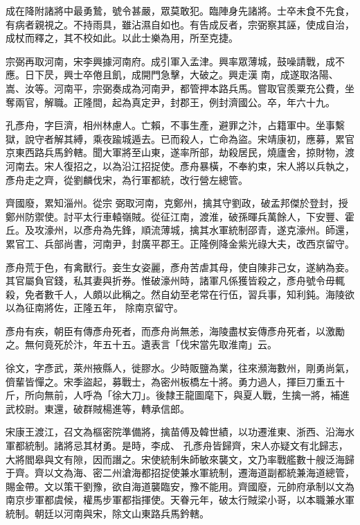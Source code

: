 \begin{pinyinscope}
 成在降附諸將中最勇鷙，號令甚嚴，眾莫敢犯。臨陣身先諸將。士卒未食不先食，有病者親視之。不持雨具，雖沾濕自如也。有告成反者，宗弼察其誣，使成自治，成杖而釋之，其不校如此。以此士樂為用，所至克捷。



 宗弼再取河南，宋李興據河南府。成引軍入孟津。興率眾薄城，鼓噪請戰，成不應。日下昃，興士卒倦且飢，成開門急擊，大破之。興走漢
 南，成遂取洛陽、嵩、汝等。河南平，宗弼奏成為河南尹，都管押本路兵馬。嘗取官羨粟充公費，坐奪兩官，解職。正隆間，起為真定尹，封郡王，例封濟國公。卒，年六十九。



 孔彥舟，字巨濟，相州林慮人。亡賴，不事生產，避罪之汴，占籍軍中。坐事繫獄，說守者解其縛，乘夜踰城遁去。已而殺人，亡命為盜。宋靖康初，應募，累官京東西路兵馬鈐轄。聞大軍將至山東，遂率所部，劫殺居民，燒廬舍，掠財物，渡河南去。宋人復招之，以為沿江招捉使。彥舟暴橫，不奉約束，宋人將以兵執之，彥舟走之齊，從劉麟伐宋，為行軍都統，改行營左總管。



 齊國廢，累知淄州。從宗
 弼取河南，克鄭州，擒其守劉政，破孟邦傑於登封，授鄭州防禦使。討平太行車轅嶺賊。從征江南，渡淮，破孫暉兵萬餘人，下安豐、霍丘。及攻濠州，以彥舟為先鋒，順流薄城，擒其水軍統制邵青，遂克濠州。師還，累官工、兵部尚書，河南尹，封廣平郡王。正隆例降金紫光祿大夫，改西京留守。



 彥舟荒于色，有禽獸行。妾生女姿麗，彥舟苦虐其母，使自陳非己女，遂納為妾。其官屬負官錢，私其妻與折券。惟破濠州時，諸軍凡係獲皆殺之，彥舟號令毋輒殺，免者數千人，人頗以此稱之。然自幼至老常在行伍，習兵事，知利鈍。海陵欲以為征南將佐，正隆五年，
 除南京留守。



 彥舟有疾，朝臣有傳彥舟死者，而彥舟尚無恙，海陵盡杖妄傳彥舟死者，以激勵之。無何竟死於汴，年五十五。遺表言「伐宋當先取淮南」云。



 徐文，字彥武，萊州掖縣人，徙膠水。少時販鹽為業，往來瀕海數州，剛勇尚氣，儕輩皆憚之。宋季盜起，募戰士，為密州板橋左十將。勇力過人，揮巨刀重五十斤，所向無前，人呼為「徐大刀」。後隸王龍圖麾下，與夏人戰，生擒一將，補進武校尉。東還，破群賊楊進等，轉承信郎。



 宋康王渡江，召文為樞密院準備將，擒苗傅及韓世績，以功遷淮東、浙西、沿海水軍都統制。諸將忌其材勇。是時，李成、
 孔彥舟皆歸齊，宋人亦疑文有北歸志，大將閻皋與文有隙，因而譖之。宋使統制朱師敏來襲文，文乃率戰艦數十艘泛海歸于齊。齊以文為海、密二州滄海都招捉使兼水軍統制，遷海道副都統兼海道總管，賜金帶。文以策干劉豫，欲自海道襲臨安，豫不能用。齊國廢，元帥府承制以文為南京步軍都虞候，權馬步軍都指揮使。天眷元年，破太行賊梁小哥，以本職兼水軍統制。朝廷以河南與宋，除文山東路兵馬鈐轄。




\end{pinyinscope}
